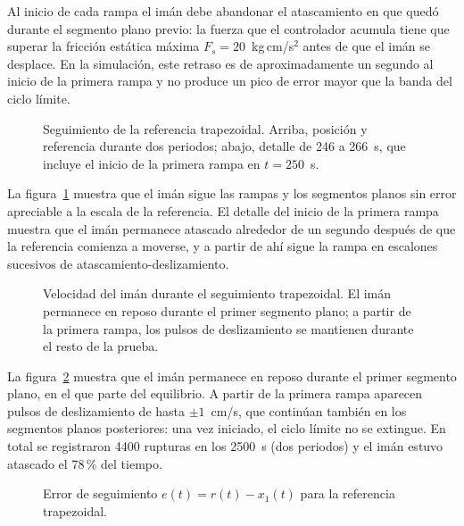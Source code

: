 Al inicio de cada rampa el imán debe abandonar el atascamiento en que quedó durante el segmento plano previo: la fuerza que el controlador acumula tiene que superar la fricción estática máxima $F_s = 20$~kg\,cm/s$^2$ antes de que el imán se desplace. En la simulación, este retraso es de aproximadamente un segundo al inicio de la primera rampa y no produce un pico de error mayor que la banda del ciclo límite.

\begin{figure}[ht]
    \centering
    
    \caption[Seguimiento trapezoidal: posición]{Seguimiento de la referencia trapezoidal. Arriba, posición y referencia durante dos periodos; abajo, detalle de 246 a 266~s, que incluye el inicio de la primera rampa en $t=250$~s.}
    \label{fig:trap_pos}
\end{figure}

La figura~\ref{fig:trap_pos} muestra que el imán sigue las rampas y los segmentos planos sin error apreciable a la escala de la referencia. El detalle del inicio de la primera rampa muestra que el imán permanece atascado alrededor de un segundo después de que la referencia comienza a moverse, y a partir de ahí sigue la rampa en escalones sucesivos de atascamiento-deslizamiento.

\FloatBarrier

\begin{figure}[ht]
    \centering
    
    \caption[Seguimiento trapezoidal: velocidad]{Velocidad del imán durante el seguimiento trapezoidal. El imán permanece en reposo durante el primer segmento plano; a partir de la primera rampa, los pulsos de deslizamiento se mantienen durante el resto de la prueba.}
    \label{fig:trap_vel}
\end{figure}

La figura~\ref{fig:trap_vel} muestra que el imán permanece en reposo durante el primer segmento plano, en el que parte del equilibrio. A partir de la primera rampa aparecen pulsos de deslizamiento de hasta $\pm 1$~cm/s, que continúan también en los segmentos planos posteriores: una vez iniciado, el ciclo límite no se extingue. En total se registraron 4400 rupturas en los 2500~s (dos periodos) y el imán estuvo atascado el 78\,\% del tiempo.

\FloatBarrier

\begin{figure}[ht]
    \centering
    
    \caption[Seguimiento trapezoidal: error]{Error de seguimiento $e(t)=r(t)-x_1(t)$ para la referencia trapezoidal.}
    \label{fig:trap_error}
\end{figure}

